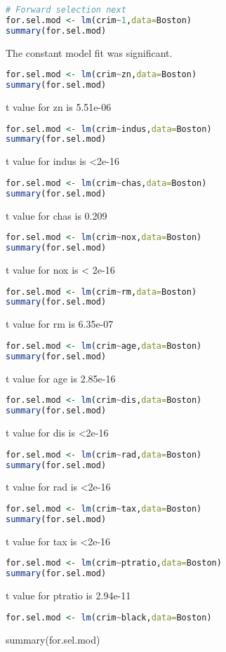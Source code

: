 \documentclass[11pt]{report}
\begin{document}
\begin{itemize}
\begin{lstlisting}[language=R]
# Forward selection next
for.sel.mod <- lm(crim~1,data=Boston)
summary(for.sel.mod)
\end{lstlisting}
The constant model fit was significant.
\begin{lstlisting}[language=R]
for.sel.mod <- lm(crim~zn,data=Boston)
summary(for.sel.mod)
\end{lstlisting}
t value for zn is 5.51e-06
\begin{lstlisting}[language=R]
for.sel.mod <- lm(crim~indus,data=Boston)
summary(for.sel.mod)
\end{lstlisting}
t value for indus is <2e-16
\begin{lstlisting}[language=R]
for.sel.mod <- lm(crim~chas,data=Boston)
summary(for.sel.mod)
\end{lstlisting}
t value for chas is 0.209
\begin{lstlisting}[language=R]
for.sel.mod <- lm(crim~nox,data=Boston)
summary(for.sel.mod)
\end{lstlisting}
t value for nox is < 2e-16
\begin{lstlisting}[language=R]
for.sel.mod <- lm(crim~rm,data=Boston)
summary(for.sel.mod)
\end{lstlisting}
t value for rm is 6.35e-07
\begin{lstlisting}[language=R]
for.sel.mod <- lm(crim~age,data=Boston)
summary(for.sel.mod)
\end{lstlisting}
t value for age is 2.85e-16
\begin{lstlisting}[language=R]
for.sel.mod <- lm(crim~dis,data=Boston)
summary(for.sel.mod)
\end{lstlisting}
t value for dis is <2e-16
\begin{lstlisting}[language=R]
for.sel.mod <- lm(crim~rad,data=Boston)
summary(for.sel.mod)
\end{lstlisting}
t value for rad is <2e-16
\begin{lstlisting}[language=R]
for.sel.mod <- lm(crim~tax,data=Boston)
summary(for.sel.mod)
\end{lstlisting}
t value for tax is <2e-16
\begin{lstlisting}[language=R]
for.sel.mod <- lm(crim~ptratio,data=Boston)
summary(for.sel.mod)
\end{lstlisting}
t value for ptratio is 2.94e-11
\begin{lstlisting}[language=R]
for.sel.mod <- lm(crim~black,data=Boston)
\end{lstlisting}
summary(for.sel.mod)

\end{itemize}
\end{document}
